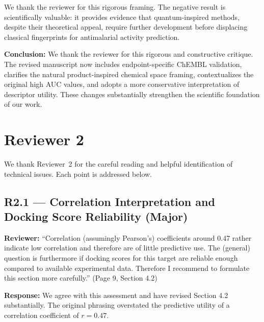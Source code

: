 \documentclass[11pt]{article}
\begin{document}
We thank the reviewer for this rigorous framing. The negative result is scientifically valuable: 
it provides evidence that quantum-inspired methods, despite their theoretical appeal, require 
further development before displacing classical fingerprints for antimalarial activity prediction.

\textbf{Conclusion:} We thank the reviewer for this rigorous and constructive critique. 
The revised manuscript now includes endpoint-specific ChEMBL validation, clarifies the 
natural product-inspired chemical space framing, contextualizes the original high AUC 
values, and adopts a more conservative interpretation of descriptor utility. These 
changes substantially strengthen the scientific foundation of our work.

\section*{Reviewer 2}

We thank Reviewer~2 for the careful reading and helpful identification of technical 
issues. Each point is addressed below.

\subsection*{R2.1 --- Correlation Interpretation and Docking Score Reliability (Major)}

\textbf{Reviewer:} ``Correlation (assumingly Pearson's) coefficients around 0.47 rather 
indicate low correlation and therefore are of little predictive use. The (general) 
question is furthermore if docking scores for this target are reliable enough compared 
to available experimental data. Therefore I recommend to formulate this section more 
carefully.'' (Page 9, Section 4.2)

\textbf{Response:} We agree with this assessment and have revised Section 4.2 substantially. 
The original phrasing overstated the predictive utility of a correlation coefficient of 
$r = 0.47$.
\end{document}

